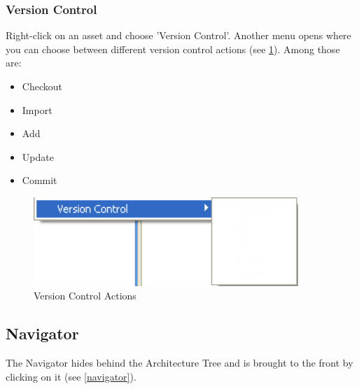 \subsubsection{Version Control}
Right-click on an asset and choose 'Version Control'. Another menu opens where you can choose
between different version control actions (see \ref{vcm}). Among those are:
\begin{itemize}
	\item Checkout
	\item Import
	\item Add
	\item Update
	\item Commit
\end{itemize}

\begin{figure}[h!]
\begin{center}
\includegraphics[width=10cm]{vcm.png}
   \caption{Version Control Actions}
\label{vcm}
\end{center}
\end{figure}\par





\subsection{Navigator}
The Navigator hides behind the Architecture Tree and is brought to the front by
clicking on it (see \ref{navigator}).

